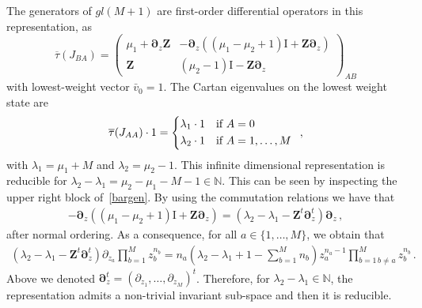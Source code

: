 \documentclass[11pt]{article}
\numberwithin{equation}{section}
\newcommand{\mmu}{\mu}
\newcommand{\M}{M}
\newcommand{\OT}{\bm{\partial}_z}
\newcommand{\OTD}{\bm{Z}}
\newcommand{\ID}{\mathrm{I}}
\newcommand{\heat}{z}
\newcommand{\dualrep}{\overline{\tau}}
\begin{document}
 The generators of $gl(M+1)$ are first-order differential operators in this representation, as
 \begin{equation}\label{bargen}
		\dualrep(J_{BA})=\left(\begin{array}{cc}
			\mmu_1+\OT\OTD&-\OT\left((\mmu_1-\mmu_2+1)\ID+\OTD\OT\right)\\
			\OTD&(\mmu_2-1)\ID-\OTD\OT
		\end{array}\right) _{AB}
	\end{equation}
    with lowest-weight vector $\bar v_0 = 1$. The Cartan eigenvalues on the lowest weight state are
    \begin{equation}
   \dualrep (J_{AA})\cdot 1=\begin{cases*}
                    \lambda_1\cdot 1 & if  $A =0$  \\
                     \lambda_2\cdot 1 & if $A=1,\ldots,M$
                 \end{cases*}\,,
    \end{equation}
with $\lambda_1=\mu_1+M$ and $\lambda_2=\mu_2-1$. This infinite dimensional representation is reducible for $\lambda_{2}-\lambda_{1}=\mu_2-\mu_1-M-1\in\mathbb{N}$. This can be seen by inspecting the upper right block of~\eqref{bargen}.
By using the commutation relations we have that
\begin{equation}
    \begin{split}
        -\OT\left((\mmu_1-\mmu_2+1)\ID+\OTD\OT\right)=\left(\lambda_{2}-\lambda_{1}-\OTD^{t}\OT^{t}\right)\OT\,,
    \end{split}
\end{equation}
after normal ordering.
As a consequence, for all $a\in \{1,\ldots,\M\}$, we obtain that
\begin{equation}
    \begin{split}
       (\lambda_{2}-\lambda_{1}-\OTD^{t}\OT^{t}) \partial_{\heat_{a}}\prod_{b=1}^{\M}\heat_{b}^{n_{b}}=n_{a}\left(\lambda_{2}-\lambda_{1}+1-\sum_{b=1}^{\M}n_{b}\right)\heat_{a}^{n_{a}-1}\prod_{b=1\,b\neq a}^{\M}\heat_{b}^{n_{b}}\,.
    \end{split}
\end{equation}
Above we denoted $\bm{\partial}_\heat^{t}=(\partial_{\heat_1},\ldots,\partial_{\heat_\M})^{t}$.
Therefore, for $\lambda_{2}-\lambda_{1}\in \mathbb{N}$, the representation admits a non-trivial invariant sub-space and then it is reducible.
\end{document}
